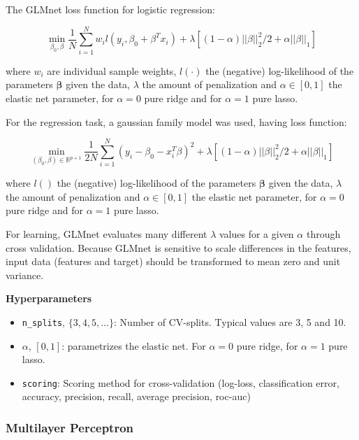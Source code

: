 \documentclass[
  11pt,
  a4paper,
  DIV=12,captions=tableheading,oneside,titlepage]{scrbook}
\providecommand{\tightlist}{%
  \setlength{\itemsep}{0pt}\setlength{\parskip}{0pt}}
\begin{document}
The GLMnet loss function for logistic regression:

\begin{equation}
\min_{\beta_0,\beta} \frac{1}{N} \sum_{i=1}^{N} w_i l(y_i,\beta_0+\beta^T x_i) + \lambda\left[(1-\alpha)||\beta||_2^2/2 + \alpha ||\beta||_1\right]
\label{eq:glmnet-logit}
\end{equation}

where \(w_i\) are individual sample weights, \(l(\cdot)\) the (negative) log-likelihood of the parameters \(\mathbf{\beta}\) given the data, \(\lambda\) the amount of penalization and \(\alpha \in [0,1]\) the elastic net parameter, for \(\alpha=0\) pure ridge and for \(\alpha=1\) pure lasso.

For the regression task, a gaussian family model was used, having loss function:

\begin{equation}
\min_{(\beta_0, \beta) \in \mathbb{R}^{p+1}}\frac{1}{2N} \sum_{i=1}^N (y_i -\beta_0-x_i^T \beta)^2+\lambda \left[ (1-\alpha)||\beta||_2^2/2 + \alpha||\beta||_1\right]
\label{eq:glmnet-gaussian}
\end{equation}

where \(l()\) the (negative) log-likelihood of the parameters \(\mathbf{\beta}\) given the data, \(\lambda\) the amount of penalization and \(\alpha \in [0,1]\) the elastic net parameter, for \(\alpha=0\) pure ridge and for \(\alpha=1\) pure lasso.

For learning, GLMnet evaluates many different \(\lambda\) values for a given \(\alpha\) through cross validation. Because GLMnet is sensitive to scale differences in the features, input data (features and target) should be transformed to mean zero and unit variance.

\textbf{Hyperparameters}

\begin{itemize}
\tightlist
\item
  \texttt{n\_splits}, \(\{3,4,5, \ldots\}\): Number of CV-splits. Typical values are 3, 5 and 10.
\item
  \(\alpha\), \([0, 1]\): parametrizes the elastic net. For \(\alpha = 0\) pure ridge, for \(\alpha = 1\) pure lasso.
\item
  \texttt{scoring}: Scoring method for cross-validation (log-loss, classification error, accuracy, precision, recall, average precision, roc-auc)
\end{itemize}

\hypertarget{multilayer-perceptron}{%
\subsubsection{Multilayer Perceptron}\label{multilayer-perceptron}}
\end{document}
